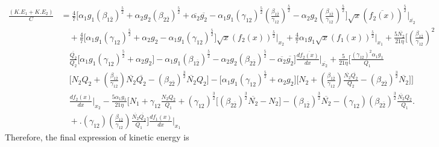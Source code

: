 \documentclass[fleqn, 10pt]{article}
\begin{document}
            \begin{equation*}
            \begin{split}
            \frac{(K.E_1+K.E_2)}{C} & = \frac{4}{7} \bigl[\alpha_1g_1(\beta_{1\overline{2}})^\frac{5}{2} + \alpha_2 g_2(\beta_{2\overline{2}})^\frac{5}{2} + \overline{\alpha_2}\overline{g_2} - \alpha_1g_1(\gamma_{12})^\frac{5}{2} \left(\frac{\beta_{1\overline{2}}}{\gamma_{12}}\right)^\frac{5}{2} - \alpha_2g_2\left(\frac{\beta_{1\overline{2}}}{\gamma_{12}}\right)^\frac{5}{2}\bigr]\sqrt{x} (\overline{f_2(x)})^\frac{5}{2}\Bigg|_{\overline{x_2}}  \\ & \quad + \frac{4}{7} \bigl[\alpha_1g_1(\gamma_{12})^\frac{5}{2} +   \alpha_2g_2  -\alpha_1g_1(\gamma_{12})^\frac{5}{2}\bigr]\sqrt{x}(f_2(x))^\frac{5}{2} \Bigg|_{x_2} +   \frac{4}{7} \alpha_1g_1\sqrt{x} (f_1(x))^\frac{5}{2}\Bigg|_{x_1} + \frac{5\overline{N_2}}{21\eta} \biggl[\left(\frac{\beta_{1\overline{2}}}{\gamma_{12}}\right)^2 \\ & \quad \frac{\overline{Q_2}}{Q_2}\bigl[\alpha_1 g_1(\gamma_{12})^\frac{5}{2} + \alpha_2 g_2 \bigr]  
            - \alpha_1 g_1 (\beta_{1\overline{2}})^\frac{5}{2} -\alpha_2 g_2 (\beta_{2\overline{2}})^\frac{5}{2}-   \overline{\alpha_2}\overline{g_2}\biggr]\frac{d\overline{f_2(x)}}{dx} \Bigg|_{\overline{x_2}} 
            + \frac{5}{21\eta}\biggl[\frac{(\gamma_{12})^2 \alpha_{1}g_{1}}{Q_1}  \\ & \quad \biggl[N_2Q_2 + \left(\frac{\beta_{1\overline{2}}}{\gamma_{12}}\right)\overline{N_2}\overline{Q_2} - (\beta_{2\overline{2}})^\frac{3}{2}\overline{N_2}Q_2\biggr] - \bigl[\alpha_1g_1 (\gamma_{12})^\frac{5}{2} + \alpha_2g_2 \bigr]  \biggl[N_2 +  \left(\frac{\beta_{1\overline{2}}}{\gamma_{12}}\right) \frac{\overline{N_2}\overline{Q_2}}{Q_2}-(\beta_{2\overline{2}})^\frac{3}{2} \overline{N_2}\biggr]\biggr]\\ & \quad \frac{df_2(x)}{dx}\Bigg|_{x_2} - \frac{5\alpha_1g_1}{21\eta}\biggl[N_1 + \gamma_{12} \frac{N_2Q_2}{Q_1}  + (\gamma_{12})^\frac{3}{2}\bigl[(\beta_{2\overline{2}})^\frac{3}{2}\overline{N_2} - N_2\bigr] - (\beta_{1\overline{2}})^\frac{3}{2}\overline{N_2}  - (\gamma_{12})(\beta_{2\overline{2}})^\frac{3}{2} \frac{\overline{N_2}Q_2}{Q_1} \biggr. \\ & \quad +   \biggl.(\gamma_{12})\left(\frac{\beta_{1\overline{2}}}{\gamma_{12}}\right)\frac{\overline{N_2}\overline{Q_2}}{Q_1}\biggr]\frac{df_1(x)}{dx}\Bigg|_{x_1}
            \end{split}
            \end{equation*}
            Therefore, the final expression of kinetic energy is
\end{document}
